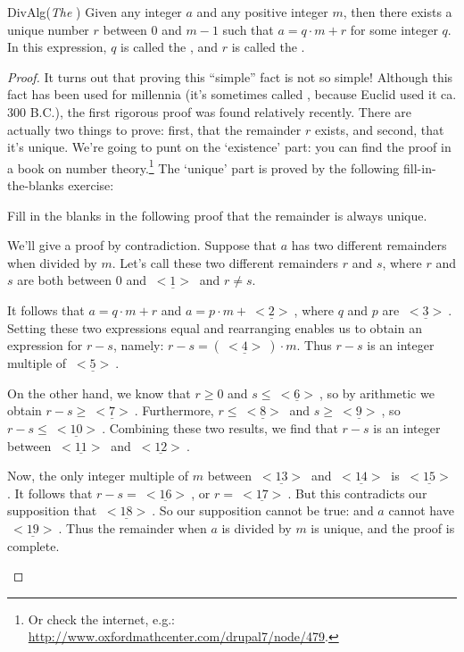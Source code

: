 \begin{prop}{DivAlg}(\emph{The })  
Given any integer $a$ and any positive integer $m$, then there exists  a unique number $r$ between $0$ and $m-1$ such that  $a = q \cdot m + r$ for some integer $q$. In this expression, $q$  is called the  , and $r$ is called the .  
\end{prop}

\begin{proof}
It turns out that proving this ``simple'' fact is not so simple! Although this fact has been used for millennia (it's sometimes called , because Euclid used it ca. 300 B.C.), the first rigorous proof was found relatively recently.  There are actually two things to prove: first, that the remainder $r$  exists, and second, that it's unique. We're going to punt on the `existence' part: you can find the proof in a book on number theory.\footnote{Or check the internet, e.g.:  \url{http://www.oxfordmathcenter.com/drupal7/node/479}.}
The `unique' part is proved by the following fill-in-the-blanks exercise:

\begin{exercise}{27} 
Fill in the blanks in the following proof that the remainder is always unique.

\noindent
We'll give a proof by contradiction. Suppose that $a$ has two different remainders when divided by $m$.  Let's call these two different remainders $r$ and $s$, where $r$ and $s$ are both between 0 and $\underline{~<1>~}$ and $r \neq s$.

It follows that $a = q \cdot m + r$ and $a = p \cdot m + \underline{~<2>~}$, where $q$ and  $p$ are $\underline{~<3>~}$. Setting these two expressions equal and rearranging enables us to obtain an expression for $r-s$, namely:
$r - s = (\underline{~<4>~})\cdot m$. Thus $r-s$ is an integer multiple of $\underline{~<5>~}$.

On the other hand, we  know that $r \ge 0$ and $s \le \underline{~<6>~}$, so by arithmetic we obtain $r - s \ge \underline{~<7>~}$.
Furthermore, $r \le \underline{~<8>~}$ and $s \ge \underline{~<9>~}$, so $r - s \le \underline{~<10>~}$. Combining these two results, we find
that $r-s$ is an integer between $\underline{~<11>~}$ and $\underline{~<12>~}$.

Now, the only integer multiple of $m$ between $\underline{~<13>~}$ and $\underline{~<14>~}$ is  $\underline{~<15>~}$.  It follows that $r - s = \underline{~<16>~}$,
or $r = \underline{~<17>~}$. But this contradicts our supposition that $\underline{~<18>~}$. So our supposition cannot be true: and $a$ cannot have $\underline{~<19>~}$.
Thus the remainder when $a$ is divided by $m$ is unique, and the proof is complete.
\end{exercise}
\end{proof}

